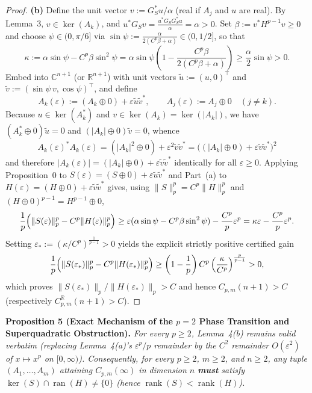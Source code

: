\documentclass[10pt,letterpaper]{article}
\newcommand{\C}{\mathbb{C}}
\newcommand{\R}{\mathbb{R}}
\newcommand{\ran}{\operatorname{ran}}
\newcommand{\rank}{\operatorname{rank}}
\begin{document}
\begin{proof}
\textbf{(b)} Define the unit vector $v := G_S^* u / \alpha$ (real if $A_j$ and $u$ are real). By Lemma~3, $v \in \ker(A_k)$, and $u^* G_S v = \frac{u^* G_S G_S^* u}{\alpha} = \alpha > 0$. Set $\beta := v^* H^{p-1} v \ge 0$ and choose $\psi \in (0,\pi/6]$ via $\sin\psi := \frac{\alpha}{2(C^p\beta + \alpha)} \in (0, 1/2]$, so that
\[
  \kappa := \alpha\sin\psi - C^p\beta\sin^2\psi = \alpha\sin\psi\left(1 - \frac{C^p\beta}{2(C^p\beta + \alpha)}\right) \ge \frac{\alpha}{2}\sin\psi > 0.
\]
Embed into $\C^{n+1}$ (or $\R^{n+1}$) with unit vectors $\tilde{u} := (u, 0)^\top$ and $\tilde{v} := (\sin\psi\,v, \cos\psi)^\top$, and define
\[
  A_k(\varepsilon) := (A_k \oplus 0) + \varepsilon\tilde{u}\tilde{v}^*, \qquad A_j(\varepsilon) := A_j \oplus 0 \quad (j \neq k).
\]
Because $u \in \ker(A_k^*)$ and $v \in \ker(A_k) = \ker(|A_k|)$, we have $(A_k^* \oplus 0)\tilde{u} = 0$ and $(|A_k| \oplus 0)\tilde{v} = 0$, whence
\[
  A_k(\varepsilon)^* A_k(\varepsilon) = (|A_k|^2 \oplus 0) + \varepsilon^2 \tilde{v}\tilde{v}^* = \bigl((|A_k| \oplus 0) + \varepsilon\tilde{v}\tilde{v}^*\bigr)^2
\]
and therefore $|A_k(\varepsilon)| = (|A_k| \oplus 0) + \varepsilon\tilde{v}\tilde{v}^*$ identically for all $\varepsilon \ge 0$. Applying Proposition~0 to $S(\varepsilon) = (S \oplus 0) + \varepsilon\tilde{u}\tilde{v}^*$ and Part~(a) to $H(\varepsilon) = (H \oplus 0) + \varepsilon\tilde{v}\tilde{v}^*$ gives, using $\|S\|_p^p = C^p\|H\|_p^p$ and $(H \oplus 0)^{p-1} = H^{p-1} \oplus 0$,
\[
  \frac{1}{p}\Bigl(\|S(\varepsilon)\|_p^p - C^p \|H(\varepsilon)\|_p^p\Bigr) \ge \varepsilon(\alpha\sin\psi - C^p\beta\sin^2\psi) - \frac{C^p}{p}\varepsilon^p = \kappa\varepsilon - \frac{C^p}{p}\varepsilon^p.
\]
Setting $\varepsilon_* := (\kappa / C^p)^{\frac{1}{p-1}} > 0$ yields the explicit strictly positive certified gain
\[
  \frac{1}{p}\Bigl(\|S(\varepsilon_*)\|_p^p - C^p \|H(\varepsilon_*)\|_p^p\Bigr)
  \ge \left(1 - \frac{1}{p}\right) C^p \left(\frac{\kappa}{C^p}\right)^{\frac{p}{p-1}} > 0,
\]
which proves $\|S(\varepsilon_*)\|_p / \|H(\varepsilon_*)\|_p > C$ and hence $C_{p,m}(n+1) > C$ (respectively $C_{p,m}^{\R}(n+1) > C$).
\end{proof}

\begin{tcolorbox}[lemmabox]
\textbf{Proposition 5 (Exact Mechanism of the $p = 2$ Phase Transition and Superquadratic Obstruction).}
\emph{For every $p \ge 2$, Lemma~4(b) remains valid verbatim (replacing Lemma~4(a)'s $\varepsilon^p/p$ remainder by the $C^2$ remainder $O(\varepsilon^2)$ of $x \mapsto x^p$ on $[0,\infty)$). Consequently, for every $p \ge 2$, $m \ge 2$, and $n \ge 2$, any tuple $(A_1,\dots,A_m)$ attaining $C_{p,m}(\infty)$ in dimension $n$ \textbf{must} satisfy $\ker(S) \cap \ran(H) \neq \{0\}$ (hence $\rank(S) < \rank(H)$).}
\end{tcolorbox}
\end{document}
